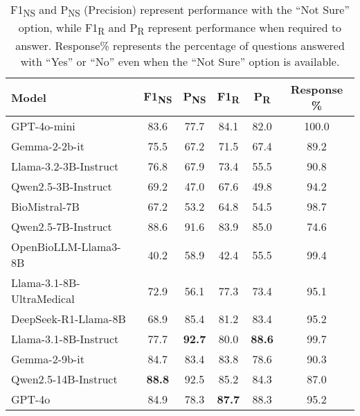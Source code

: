 \begin{table}[t]
\centering
\scriptsize
\begin{tabular}{@{}l c c c c c@{}}
\toprule
\textbf{Model} & \textbf{F1\textsubscript{NS}} & \textbf{P\textsubscript{NS}} & \textbf{F1\textsubscript{R}} & \textbf{P\textsubscript{R}} & \textbf{Response \%} \\ 
\midrule
GPT-4o-mini                & 83.6 & 77.7 & 84.1 & 82.0 & 100.0 \\
Gemma-2-2b-it             & 75.5 & 67.2 & 71.5 & 67.4 & 89.2  \\
Llama-3.2-3B-Instruct       & 76.8 & 67.9 & 73.4 & 55.5 & 90.8  \\
Qwen2.5-3B-Instruct         & 69.2 & 47.0 & 67.6 & 49.8 & 94.2  \\
BioMistral-7B             & 67.2 & 53.2 & 64.8 & 54.5 & 98.7  \\
Qwen2.5-7B-Instruct         & 88.6 & 91.6 & 83.9 & 85.0 & 74.6  \\
OpenBioLLM-Llama3-8B        & 40.2 & 58.9 & 42.4 & 55.5 & 99.4  \\
Llama-3.1-8B-UltraMedical   & 72.9 & 56.1 & 77.3 & 73.4 & 95.1  \\
DeepSeek-R1-Llama-8B& 68.9 & 85.4 & 81.2 & 83.4 & 95.2  \\
Llama-3.1-8B-Instruct       & 77.7 & \textbf{92.7} & 80.0 & \textbf{88.6} & 99.7  \\
Gemma-2-9b-it             & 84.7 & 83.4 & 83.8 & 78.6 & 90.3  \\
Qwen2.5-14B-Instruct        & \textbf{88.8} & 92.5 & 85.2 & 84.3 & 87.0  \\
GPT-4o                    & 84.9 & 78.3 & \textbf{87.7} & 88.3 & 95.2  \\
\bottomrule
\end{tabular}
\caption{ F1\textsubscript{NS} and P\textsubscript{NS} (Precision) represent performance with the ``Not Sure'' option, while F1\textsubscript{R} and P\textsubscript{R} represent performance when required to answer. Response\% represents the percentage of questions answered with ``Yes'' or ``No'' even when the ``Not Sure'' option is available.}
\label{tab:model-comparison-with-knowledge}
\end{table}
